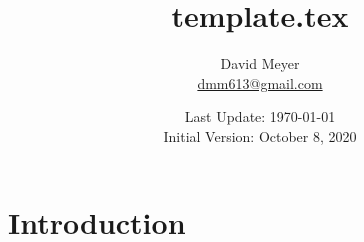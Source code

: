 \documentclass{article}
\title{template.tex}
\author{David Meyer \\ \href{mailto:dmm613@gmail.com}
                            {dmm613@gmail.com}}
\date{Last Update: \today \\
	 {\vspace{1.00mm} \small Initial Version: October 8, 2020}}
\theoremstyle{definition}
\begin{document}
\maketitle
%
%
%
\section{Introduction}
\label{section:introduction}
%
%
%
%
%
%
%
%
%
%
%	
%
\end{document}
